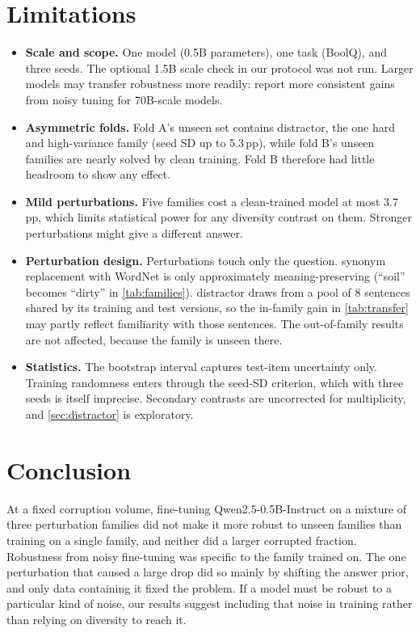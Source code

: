 \documentclass[11pt]{article}
\newcommand{\ppts}{\,pp}
\newcommand{\pfam}[1]{\textsf{#1}}
\begin{document}
\section{Limitations}
\label{sec:limitations}

\begin{itemize}
  \item \textbf{Scale and scope.} One model (0.5B parameters), one task (BoolQ), and three seeds. The optional 1.5B scale check in our protocol was not run. Larger models may transfer robustness more readily: \citet{alajrami2025noisy} report more consistent gains from noisy tuning for 70B-scale models.
  \item \textbf{Asymmetric folds.} Fold A's unseen set contains \pfam{distractor}, the one hard and high-variance family (seed SD up to 5.3\ppts{}), while fold B's unseen families are nearly solved by clean training. Fold B therefore had little headroom to show any effect.
  \item \textbf{Mild perturbations.} Five families cost a clean-trained model at most 3.7\ppts{}, which limits statistical power for any diversity contrast on them. Stronger perturbations might give a different answer.
  \item \textbf{Perturbation design.} Perturbations touch only the question. \pfam{synonym} replacement with WordNet is only approximately meaning-preserving (``soil'' becomes ``dirty'' in \cref{tab:families}). \pfam{distractor} draws from a pool of 8 sentences shared by its training and test versions, so the in-family gain in \cref{tab:transfer} may partly reflect familiarity with those sentences. The out-of-family results are not affected, because the family is unseen there.
  \item \textbf{Statistics.} The bootstrap interval captures test-item uncertainty only. Training randomness enters through the seed-SD criterion, which with three seeds is itself imprecise. Secondary contrasts are uncorrected for multiplicity, and \cref{sec:distractor} is exploratory.
\end{itemize}

\section{Conclusion}

At a fixed corruption volume, fine-tuning Qwen2.5-0.5B-Instruct on a mixture of three perturbation families did not make it more robust to unseen families than training on a single family, and neither did a larger corrupted fraction. Robustness from noisy fine-tuning was specific to the family trained on. The one perturbation that caused a large drop did so mainly by shifting the answer prior, and only data containing it fixed the problem. If a model must be robust to a particular kind of noise, our results suggest including that noise in training rather than relying on diversity to reach it.
\end{document}
